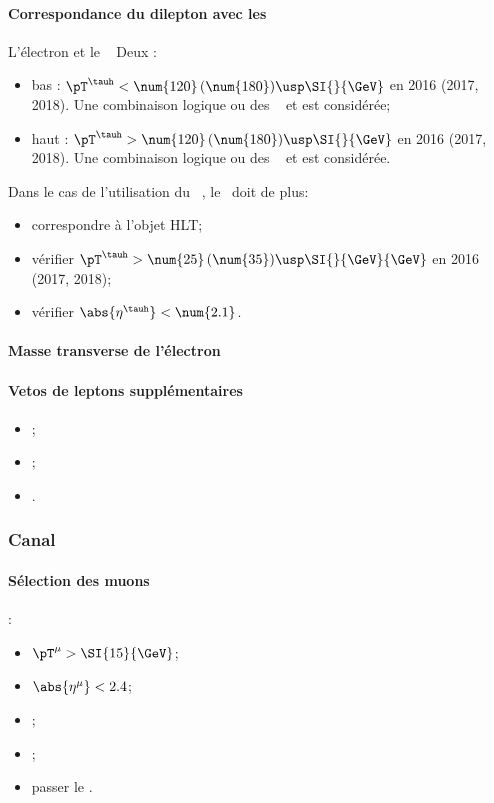 \paragraph{Correspondance du dilepton avec les \HLTpaths}
L'électron et le \tauh\ \FromPairMatchToHLTObjects{}
Deux \HLTregionsDefined:
\begin{itemize}
    \item bas \pT: $\pT^{\tauh} < \num{120} \, (\num{180}) \usp \SI{}{\GeV}$ en 2016 (2017, 2018).
        Une combinaison logique \og ou \fg{} des \HLTpaths\ \HLTSingleEle{} et \HLTEleTauCross{} est considérée;
    \item haut \pT: $\pT^{\tauh} > \num{120} \, (\num{180}) \usp \SI{}{\GeV}$ en 2016 (2017, 2018).
        Une combinaison logique \og ou \fg{} des \HLTpaths\ \HLTSingleEle{} et \HLTSingleTau{} est considérée.
\end{itemize}
Dans le cas de l'utilisation du \HLTpath\ \HLTEleTauCross{}, le \tauh\ doit de plus:
\begin{itemize}
    \item correspondre à l'objet HLT;
    \item vérifier $\pT^{\tauh} > \num{25} \, (\num{35}) \usp \SI{}{\GeV}{\GeV}$ en 2016 (2017, 2018);
    \item vérifier $\abs{\eta^{\tauh}} < \num{2.1}$.
\end{itemize}
\paragraph{Masse transverse de l'électron}
\paragraph{Vetos de leptons supplémentaires}
\LeptonVetoes
\begin{itemize}
    \item \LeptonVetoesExtraMuon;
    \item \LeptonVetoesSecondEle;
    \item \LeptonVetoesElectronPair.
\end{itemize}

\subsubsection{Canal \ele\mu}\label{chapter-HTT_analysis-section-offline-em}
\paragraph{Sélection des muons}
:
\begin{itemize}
    \item $\pT^{\mu} > \SI{15}{\GeV}$;
    \item $\abs{\eta^{\mu}} < 2.4$;
    \item \Leptondzdxy;
    \item {};
    \item passer le \MediumMuonID.
\end{itemize}
